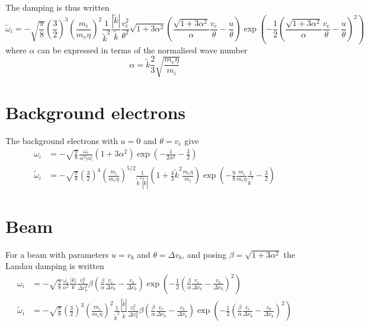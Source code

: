 \documentclass[10pt,a4paper]{article}
\begin{document}
The damping is thus written
\begin{equation}
\tilde{\omega}_i=-\sqrt{\frac{\pi}{8}}
\left(\frac{3}{2}\right)^3\left(\frac{m_i}{m_e\eta}\right)^2
\frac{1}{\tilde{k}^2}\frac{|\tilde{k}|}{\tilde{k}}\frac{v_e^2}{\theta^2}
\sqrt{1{+}3\alpha^2}
\left(
\frac{\sqrt{1{+}3\alpha^2}}{\alpha}\frac{v_e}{\theta}-\frac{u}{\theta}
\right)
\exp\left(-\frac{1}{2}\left(
\frac{\sqrt{1{+}3\alpha^2}}{\alpha}\frac{v_e}{\theta}-\frac{u}{\theta}
\right)^2\right)
\end{equation}
where $\alpha$ can be expressed in terms of the normalised wave number
\[
\alpha = \tilde{k}\frac{2}{3}\sqrt{\frac{m_e\eta}{m_i}}
\]

\section{Background electrons}
The background electrons with $u=0$ and $\theta=v_e$ give
\begin{align}
\omega_i&=-\sqrt{\frac{\pi}{8}}\frac{\omega_e}{\alpha^2|\alpha|}
\left(1{+}3\alpha^2\right)\exp\left(-\frac{1}{2\alpha^2}-\frac{3}{2}\right)\\
\tilde{\omega}_i&=-\sqrt{\frac{\pi}{8}}
\left(\frac{3}{2}\right)^4\left(\frac{m_i}{m_e\eta}\right)^{5/2}
\frac{1}{\tilde{k}^2|\tilde{k}|}
\left(1+\frac{4}{3}\tilde{k}^2\frac{m_e\eta}{m_i}\right)
\exp\left(-\frac{9}{8}\frac{m_i}{m_e\eta}\frac{1}{\tilde{k}^2}-
\frac{3}{2}\right)
\end{align}


\section{Beam}
For a beam with parameters $u=v_b$ and $\theta=\Delta v_b$, and posing 
$\beta=\sqrt{1{+}3\alpha^2}$ the Landau damping is written
\begin{align}
\omega_i&=-\sqrt{\frac{\pi}{8}}\frac{\omega_e}{\alpha^2}\frac{|k|}{k}
\frac{v_e^2}{\Delta v_b^2}\beta
\left(\frac{\beta}{\alpha}\frac{v_e}{\Delta v_b}-
\frac{v_b}{\Delta v_b}\right)
\exp\left(-\frac{1}{2}\left(
\frac{\beta}{\alpha}\frac{v_e}{\Delta v_b}-\frac{v_b}{\Delta v_b}
\right)^2\right)\\
\tilde{\omega}_i&=-\sqrt{\frac{\pi}{8}}
\left(\frac{3}{2}\right)^3\left(\frac{m_i}{m_e\eta}\right)^2
\frac{1}{\tilde{k}^2}\frac{|\tilde{k}|}{\tilde{k}}
\frac{v_e^2}{\Delta v_b^2}\beta
\left(\frac{\beta}{\alpha}\frac{v_e}{\Delta v_b}-
\frac{v_b}{\Delta v_b}\right)
\exp\left(-\frac{1}{2}\left(
\frac{\beta}{\alpha}\frac{v_e}{\Delta v_b}-\frac{v_b}{\Delta v_b}
\right)^2\right)
\end{align}
\end{document}
